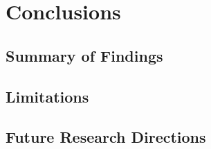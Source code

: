 
\section{Conclusions}
\subsection{Summary of Findings}
\subsection{Limitations}
\subsection{Future Research Directions}